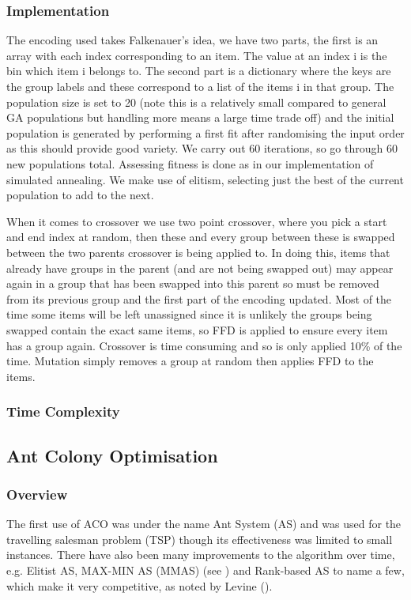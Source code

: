 \documentclass[12pt]{article}
\begin{document}
\subsubsection{Implementation}
The encoding used takes Falkenauer's idea, we have two parts, the first is an array with each index corresponding to an item. The value at an index i is the bin which item i belongs to. The second part is a dictionary where the keys are the group labels and these correspond to a list of the items i in that group. The population size is set to 20 (note this is a relatively small compared to general GA populations but handling more means a large time trade off) and the initial population is generated by performing a first fit after randomising the input order as this should provide good variety. We carry out 60 iterations, so go through 60 new populations total. Assessing fitness is done as in our implementation of simulated annealing. We make use of elitism, selecting just the best of the current population to add to the next. 

When it comes to crossover we use two point crossover, where you pick a start and end index at random, then these and every group between these is swapped between the two parents crossover is being applied to. In doing this, items that already have groups in the parent (and are not being swapped out) may appear again in a group that has been swapped into this parent so must be removed from its previous group and the first part of the encoding updated. Most of the time some items will be left unassigned since it is unlikely the groups being swapped contain the exact same items, so FFD is applied to ensure every item has a group again. Crossover is time consuming and so is only applied 10\% of the time. Mutation simply removes a group at random then applies FFD to the items.

\subsubsection{Time Complexity}

\subsection{Ant Colony Optimisation}

\subsubsection{Overview}

The first use of ACO was under the name Ant System (AS) and was used for the travelling salesman problem (TSP) though its effectiveness was limited to small instances. There have also been many improvements to the algorithm over time, e.g. Elitist AS, MAX-MIN AS (MMAS) (see \cite{stuetzle}) and Rank-based AS to name a few, which make it very competitive, as noted by Levine (\cite{levine}).  
\end{document}
